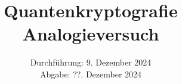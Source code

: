 

\subject{\texorpdfstring{\vspace{2ex}}{}V00\texorpdfstring{\vspace{-2ex}}{}} %
\title{Quantenkryptografie Analogieversuch} %
\date{
	Durchführung: 9. Dezember 2024 %
	\\ Abgabe: ??. Dezember 2024 %
}





\maketitle
\thispagestyle{empty}

\tableofcontents
\newpage








\printbibliography{}

\newpage



